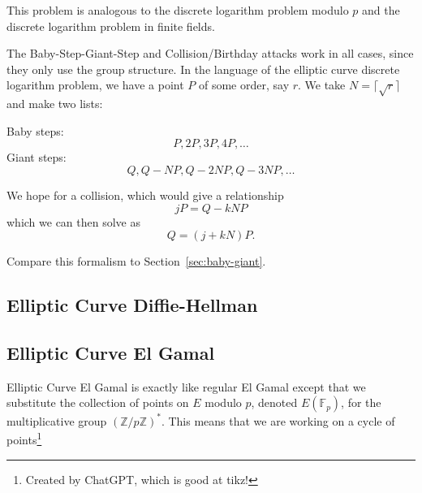 \documentclass{article}
\theoremstyle{plain}
\theoremstyle{definition}
\theoremstyle{remark}
\numberwithin{theorem}{section}
\newcommand{\FF}{\mathbb{F}}
\newcommand{\ZZ}{\mathbb{Z}}
\begin{document}
This problem is analogous to the discrete logarithm problem modulo $p$ and the discrete logarithm problem in finite fields.

The Baby-Step-Giant-Step and Collision/Birthday attacks work in all cases, since they only use the group structure.  In the language of the elliptic curve discrete logarithm problem, we have a point $P$ of some order, say $r$.  We take $N = \lceil \sqrt{r} \rceil$ and make two lists:

Baby steps:
\[
P, 2P, 3P, 4P, \ldots
\]
Giant steps:
\[
Q, Q - NP, Q-2NP, Q-3NP, \ldots
\]

We hope for a collision, which would give a relationship
\[
jP = Q - kNP
\]
which we can then solve as
\[
Q = (j + kN)P.
\]

Compare this formalism to Section~\ref{sec:baby-giant}.


\subsection{Elliptic Curve Diffie-Hellman}

\subsection{Elliptic Curve El Gamal}

Elliptic Curve El Gamal is exactly like regular El Gamal except that we substitute the collection of points on $E$ modulo $p$, denoted $E(\FF_p)$, for the multiplicative group $(\ZZ/p\ZZ)^*$.  This means that we are working on a cycle of points\footnote{Created by ChatGPT, which is good at tikz!}

\begin{center}
\end{center}
\end{document}

